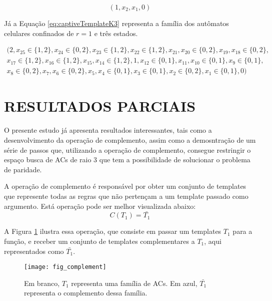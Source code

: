 	\begin{equation}
	(1,x_2,x_1,0)
	\label{eq:captiveTemplateR05}
	\end{equation}

	Já a Equação \ref{eq:captiveTemplateK3} representa a família dos autômatos celulares confinados de $r=1$ e três estados.

	\begin{equation}
	\begin{split}
	(2, x_{25} \in \{1,2\}, x_{24} \in \{0,2\}, x_{23} \in \{1,2\}, x_{22} \in \{1,2\}, x_{21}, x_{20} \in \{0,2\}, x_{19}, x_{18} \in \{0,2\}, \\
	x_{17} \in \{1,2\}, x_{16} \in \{1,2\}, x_{15}, x_{14} \in \{1,2\},1, x_{12} \in \{0,1\}, x_{11}, x_{10} \in \{0,1\}, x_9 \in \{0,1\}, \\
	x_8 \in \{0,2\}, x_7, x_6 \in \{0,2\}, x_5, x_4 \in \{0,1\}, x_3 \in \{0,1\}, x_2 \in \{0,2\}, x_1 \in \{0,1\}, 0)
	\label{eq:captiveTemplateK3}
	\end{split}
	\end{equation}









\section{RESULTADOS PARCIAIS}\label{sec:aplicacao}

	O presente estudo já apresenta resultados interessantes, tais como a desenvolvimento da operação de complemento, assim como a demosntração de um série de passos que, utilizando a operação de complemento, consegue restringir o espaço busca de ACs de raio 3 que tem a possibilidade de solucionar o problema de paridade.

	A operação de complemento é responsável por obter um conjunto de templates que represente todas as regras que não pertençam a um template passado como argumento. Está operação pode ser melhor visualizada abaixo:
	\begin{equation}
	C(T_1)=\bar{T_1}
	\end{equation}

	A Figura \ref{fig:complement} ilustra essa operação, que consiste em passar um templates $T_1$ para a função, e receber um conjunto de templates complementares a $T_1$, aqui representados como $\bar{T_1}$.

	\begin{figure}[h!]
	  \centering
	  \texttt{[image: fig\_complement]}
	  \caption{Em branco, $T_1$ representa uma família de ACs. Em azul, $\bar{T_1}$ representa o complemento dessa família.}
	  \label{fig:complement}
	\end{figure}

